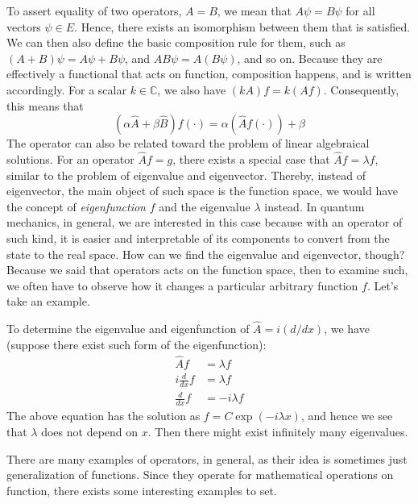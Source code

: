 To assert equality of two operators, $A=B$, we mean that $A\psi = B\psi$ for all vectors $\psi\in E$. Hence, there exists an isomorphism between them that is satisfied. We can then also define the basic composition rule for them, such as $(A+B)\psi = A\psi + B\psi$, and $AB\psi=A(B\psi)$, and so on. Because they are effectively a functional that acts on function, composition happens, and is written accordingly. For a scalar $k\in \mathbb{C}$, we also have $(kA)f=k(Af)$. Consequently, this means that 
\begin{equation}
    (\alpha \hat{A}+ \beta \hat{B})f(\cdot) = \alpha (\hat{A}f(\cdot)) + \beta 
\end{equation}
The operator can also be related toward the problem of linear algebraical solutions. For an operator $\hat{A}f=g$, there exists a special case that $\hat{A}f=\lambda f$, similar to the problem of eigenvalue and eigenvector. Thereby, instead of eigenvector, the main object of such space is the function space, we would have the concept of \textit{eigenfunction} $f$ and the eigenvalue $\lambda$ instead. In quantum mechanics, in general, we are interested in this case because with an operator of such kind, it is easier and interpretable of its components to convert from the state to the real space. How can we find the eigenvalue and eigenvector, though? Because we said that operators acts on the function space, then to examine such, we often have to observe how it changes a particular arbitrary function $f$. Let's take an example. 
\begin{example}
    To determine the eigenvalue and eigenfunction of $\hat{A}=i(d/dx)$, we have (suppose there exist such form of the eigenfunction):
    \begin{align}
        \hat{A}f &= \lambda f\\
        i \frac{d}{dx} f &= \lambda f\\
        \frac{d}{dx} f &= -i\lambda f
    \end{align}
    The above equation has the solution as $f=C\exp{(-i\lambda x)}$, and hence we see that $\lambda$ does not depend on $x$. Then there might exist infinitely many eigenvalues.
\end{example}

There are many examples of operators, in general, as their idea is sometimes just generalization of functions. Since they operate for mathematical operations on function, there exists some interesting examples to set. 

